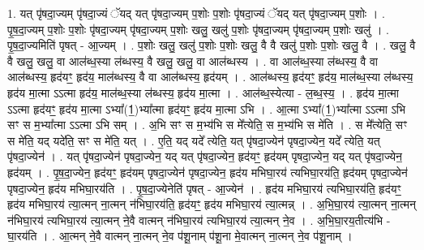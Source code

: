 \documentclass[17pt]{extarticle}
\begin{document}
1. यत् पृ॑षदा॒ज्यम् पृ॑षदा॒ज्यं ॅयद् यत् पृ॑षदा॒ज्यम् प॒शोः प॒शोः पृ॑षदा॒ज्यं ॅयद् यत् पृ॑षदा॒ज्यम् प॒शोः । . पृ॒ष॒दा॒ज्यम् प॒शोः प॒शोः पृ॑षदा॒ज्यम् पृ॑षदा॒ज्यम् प॒शोः खलु॒ खलु॑ प॒शोः पृ॑षदा॒ज्यम् पृ॑षदा॒ज्यम् प॒शोः खलु॑ । . पृ॒ष॒दा॒ज्यमिति॑ पृषत् - आ॒ज्यम् । . प॒शोः खलु॒ खलु॑ प॒शोः प॒शोः खलु॒ वै वै खलु॑ प॒शोः प॒शोः खलु॒ वै । . खलु॒ वै वै खलु॒ खलु॒ वा आल॑ब्ध॒स्या ल॑ब्धस्य॒ वै खलु॒ खलु॒ वा आल॑ब्धस्य । . वा आल॑ब्ध॒स्या ल॑ब्धस्य॒ वै वा आल॑ब्धस्य॒ हृद॑यꣳ॒॒ हृद॑य॒ माल॑ब्धस्य॒ वै वा आल॑ब्धस्य॒ हृद॑यम् । . आल॑ब्धस्य॒ हृद॑यꣳ॒॒ हृद॑य॒ माल॑ब्ध॒स्या ल॑ब्धस्य॒ हृद॑य मा॒त्मा ऽऽत्मा हृद॑य॒ माल॑ब्ध॒स्या ल॑ब्धस्य॒ हृद॑य मा॒त्मा । . आल॑ब्ध॒स्येत्या - ल॒ब्ध॒स्य॒ । . हृद॑य मा॒त्मा ऽऽत्मा हृद॑यꣳ॒॒ हृद॑य मा॒त्मा ऽभ्या᳚(1॒)भ्या᳚त्मा हृद॑यꣳ॒॒ हृद॑य मा॒त्मा ऽभि । . आ॒त्मा ऽभ्या᳚(1॒)भ्या᳚त्मा ऽऽत्मा ऽभि सꣳ स म॒भ्या᳚त्मा ऽऽत्मा ऽभि सम् । . अ॒भि सꣳ स म॒भ्य॑भि स मे᳚त्येति॒ स म॒भ्य॑भि स मे॑ति । . स मे᳚त्येति॒ सꣳ स मे॑ति॒ यद् यदे॑ति॒ सꣳ स मे॑ति॒ यत् । . ए॒ति॒ यद् यदे᳚ त्येति॒ यत् पृ॑षदा॒ज्येन॑ पृषदा॒ज्येन॒ यदे᳚ त्येति॒ यत् पृ॑षदा॒ज्येन॑ । . यत् पृ॑षदा॒ज्येन॑ पृषदा॒ज्येन॒ यद् यत् पृ॑षदा॒ज्येन॒ हृद॑यꣳ॒॒ हृद॑यम् पृषदा॒ज्येन॒ यद् यत् पृ॑षदा॒ज्येन॒ हृद॑यम् । . पृ॒ष॒दा॒ज्येन॒ हृद॑यꣳ॒॒ हृद॑यम् पृषदा॒ज्येन॑ पृषदा॒ज्येन॒ हृद॑य मभिघा॒रय॑ त्यभिघा॒रय॑ति॒ हृद॑यम् पृषदा॒ज्येन॑ पृषदा॒ज्येन॒ हृद॑य मभिघा॒रय॑ति । . पृ॒ष॒दा॒ज्येनेति॑ पृषत् - आ॒ज्येन॑ । . हृद॑य मभिघा॒रय॑ त्यभिघा॒रय॑ति॒ हृद॑यꣳ॒॒ हृद॑य मभिघा॒रय॑ त्या॒त्मन् ना॒त्मन् न॑भिघा॒रय॑ति॒ हृद॑यꣳ॒॒ हृद॑य मभिघा॒रय॑ त्या॒त्मन्न् । . अ॒भि॒घा॒रय॑ त्या॒त्मन् ना॒त्मन् न॑भिघा॒रय॑ त्यभिघा॒रय॑ त्या॒त्मन् ने॒वै वात्मन् न॑भिघा॒रय॑ त्यभिघा॒रय॑ त्या॒त्मन् ने॒व । . अ॒भि॒घा॒रय॒तीत्य॑भि - घा॒रय॑ति । . आ॒त्मन् ने॒वै वात्मन् ना॒त्मन् ने॒व प॑शू॒नाम् प॑शू॒ना मे॒वात्मन् ना॒त्मन् ने॒व प॑शू॒नाम् । \newline
\end{document}
